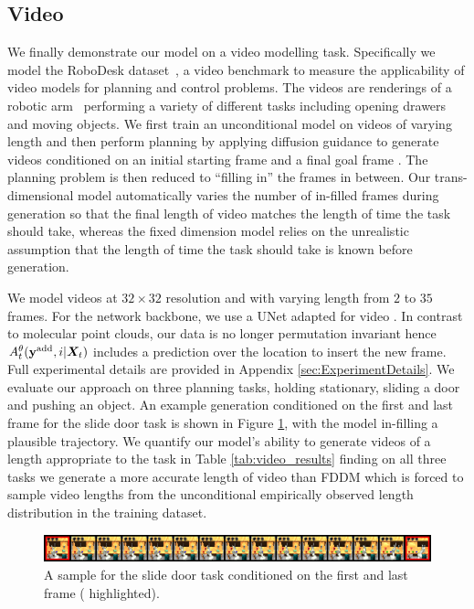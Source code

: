 \subsection{Video}

We finally demonstrate our model on a video modelling task. Specifically we model the RoboDesk dataset~\citep{tian2023control}, a video benchmark to measure the applicability of video models for planning and control problems. The videos are renderings of a robotic arm~\citep{kannan2021robodesk} performing a variety of different tasks including opening drawers and moving objects.
We first train an unconditional model on videos of varying length and then perform planning by applying diffusion guidance to generate videos conditioned on an initial starting frame and a final goal frame \cite{janner2022diffuser}. The planning problem is then reduced to ``filling in'' the frames in between. Our trans-dimensional model automatically varies the number of in-filled frames during generation so that the final length of video matches the length of time the task should take, whereas the fixed dimension model relies on the unrealistic assumption that the length of time the task should take is known before generation.

We model videos at $32 \times 32$ resolution and with varying length from $2$ to $35$ frames. For the network backbone, we use a UNet adapted for video \cite{harvey2022flexible}. In contrast to molecular point clouds, our data is no longer permutation invariant hence $A_t^\theta(\mathbf{y}^{\textup{add}}, i | {\bm{X}}_t)$ includes a prediction over the location to insert the new frame. Full experimental details are provided in Appendix \ref{sec:ExperimentDetails}.
We evaluate our approach on three planning tasks, holding stationary, sliding a door and pushing an object. An example generation conditioned on the first and last frame for the slide door task is shown in Figure \ref{fig:tddm-video_example}, with the model in-filling a plausible trajectory. We quantify our model's ability to generate videos of a length appropriate to the task in Table \ref{tab:video_results} finding on all three tasks we generate a more accurate length of video than FDDM which is forced to sample video lengths from the unconditional empirically observed length distribution in the training dataset.


\begin{figure}[h]
    \centering
    \includegraphics[width=\textwidth]{figs/tddm/21-1-padded_red_big.png}
    \caption{A sample for the slide door task conditioned on the first and last frame ({\color{red} highlighted}).}
    \label{fig:tddm-video_example}
\end{figure}

